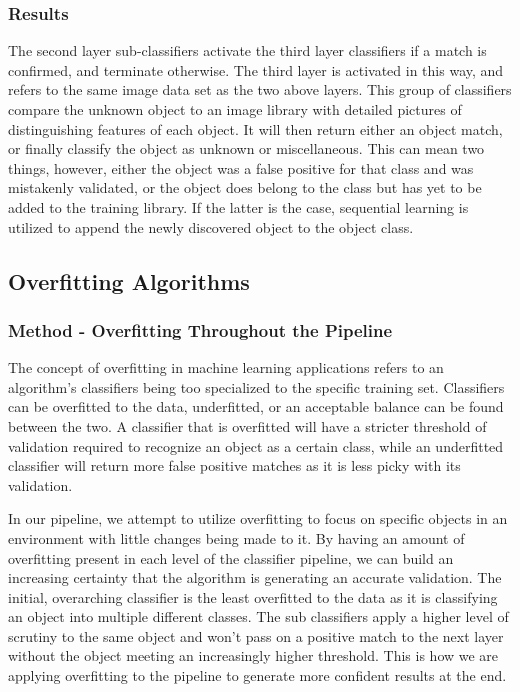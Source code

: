 \documentclass[draftclsnofoot, onecolumn, 10pt, compsoc]{IEEEtran}
\begin{document}
			\subsubsection{Results}
				The second layer sub-classifiers activate the third layer classifiers if a match is confirmed, and terminate otherwise. The third layer is activated in this way, and refers to the same image data set as the two above layers. This group of classifiers compare the unknown object to an image library with detailed pictures of distinguishing features of each object. It will then return either an object match, or finally classify the object as unknown or miscellaneous. This can mean two things, however, either the object was a false positive for that class and was mistakenly validated, or the object does belong to the class but has yet to be added to the training library. If the latter is the case, sequential learning is utilized to append the newly discovered object to the object class. 
		
		\subsection{Overfitting Algorithms}
			\subsubsection{Method - Overfitting Throughout the Pipeline}
				The concept of overfitting in machine learning applications refers to an algorithm’s classifiers being too specialized to the specific training set. Classifiers can be overfitted to the data, underfitted, or an acceptable balance can be found between the two. A classifier that is overfitted will have a stricter threshold of validation required to recognize an object as a certain class, while an underfitted classifier will return more false positive matches as it is less picky with its validation. 
				
				In our pipeline, we attempt to utilize overfitting to focus on specific objects in an environment with little changes being made to it. By having an amount of overfitting present in each level of the classifier pipeline, we can build an increasing certainty that the algorithm is generating an accurate validation. The initial, overarching classifier is the least overfitted to the data as it is classifying an object into multiple different classes. The sub classifiers apply a higher level of scrutiny to the same object and won’t pass on a positive match to the next layer without the object meeting an increasingly higher threshold. This is how we are applying overfitting to the pipeline to generate more confident results at the end. 
			
\end{document}
